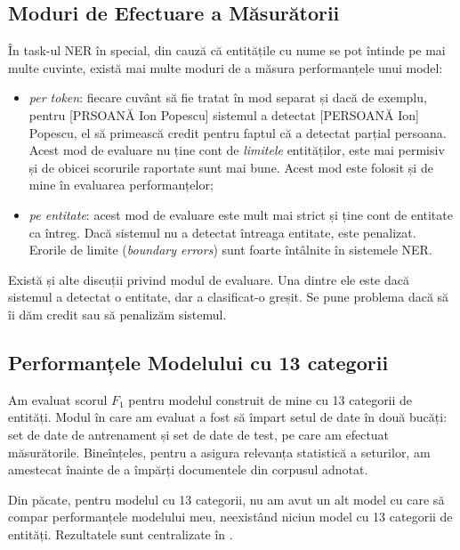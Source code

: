\subsection{Moduri de Efectuare a Măsurătorii}

În task-ul NER în special, din cauză că entitățile cu nume se pot întinde pe mai multe cuvinte, există mai multe moduri de a măsura performanțele unui model:

\begin{itemize}
\item \textit{per token}: fiecare cuvânt să fie tratat în mod separat și dacă de exemplu, pentru [PRSOANĂ Ion Popescu] sistemul a detectat [PERSOANĂ Ion] Popescu, el să primească credit pentru faptul că a detectat parțial persoana. Acest mod de evaluare nu ține cont de \textit{limitele} entităților, este mai permisiv și de obicei scorurile raportate sunt mai bune. Acest mod este folosit și de mine în evaluarea performanțelor;

\item \textit{pe entitate}: acest mod de evaluare este mult mai strict și ține cont de entitate ca întreg. Dacă sistemul nu a detectat întreaga entitate, este penalizat. Erorile de limite (\textit{boundary errors}) sunt foarte întâlnite în sistemele NER.

\end{itemize}

Există și alte discuții privind modul de evaluare. Una dintre ele este dacă sistemul a detectat o entitate, dar a clasificat-o greșit. Se pune problema dacă să îi dăm credit sau să penalizăm sistemul.

\subsection{Performanțele Modelului cu 13 categorii}

Am evaluat scorul $F_1$ pentru modelul construit de mine cu 13 categorii de entități. Modul în care am evaluat a fost să împart setul de date în două bucăți: set de date de antrenament și set de date de test, pe care am efectuat măsurătorile. Bineînțeles, pentru a asigura relevanța statistică a seturilor, am amestecat înainte de a împărți documentele din corpusul adnotat.


Din păcate, pentru modelul cu 13 categorii, nu am avut un alt model cu care să compar performanțele modelului meu, neexistând niciun model cu 13 categorii de entități. Rezultatele sunt centralizate în .


